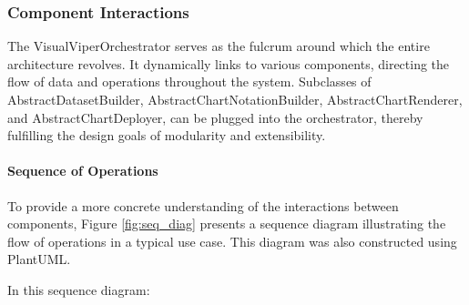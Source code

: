 \subsubsection{Component Interactions}\label{component-interactions}

The VisualViperOrchestrator serves as the fulcrum around which the
entire architecture revolves. It dynamically links to various
components, directing the flow of data and operations throughout the
system. Subclasses of AbstractDatasetBuilder,
AbstractChartNotationBuilder, AbstractChartRenderer, and
AbstractChartDeployer, can be plugged into the orchestrator, thereby
fulfilling the design goals of modularity and extensibility.


\paragraph{Sequence of Operations}\label{sequence-of-operations}

To provide a more concrete understanding of the interactions between
components, Figure \ref{fig:seq_diag} presents a sequence diagram illustrating the flow
of operations in a typical use case. This diagram was also constructed
using PlantUML.

In this sequence diagram:

